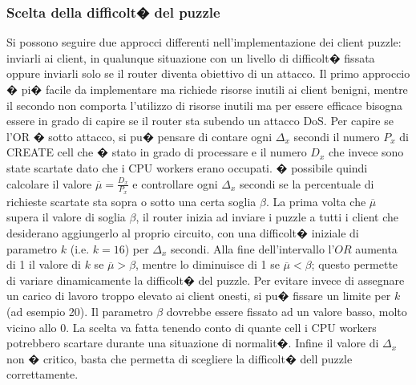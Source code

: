 \subsubsection{Scelta della difficolt� del puzzle}
Si possono seguire due approcci differenti nell'implementazione dei client puzzle: inviarli ai client, in qualunque situazione con un livello di difficolt� fissata oppure inviarli solo se il router diventa obiettivo di un attacco. Il primo approccio � pi� facile da implementare ma richiede risorse inutili ai client benigni, mentre il secondo non comporta l'utilizzo di risorse inutili ma per essere efficace bisogna essere in grado di capire se il router sta subendo un attacco DoS. Per capire se l'OR � sotto attacco, si pu� pensare di contare ogni $\Delta_{x}$ secondi il numero $P_{x}$ di {\ttfamily CREATE} cell che � stato in grado di processare e il numero $D_{x}$ che invece sono state scartate dato che i CPU workers erano occupati. � possibile quindi calcolare il valore $\overline{\mu}=\frac{D_{x}}{P_{x}}$ e controllare ogni $\Delta_{x}$ secondi se la percentuale di richieste scartate sta sopra o sotto una certa soglia $\beta$. La prima volta che $\overline{\mu}$ supera il valore di soglia $\beta$, il router inizia ad inviare i puzzle a tutti i client che desiderano aggiungerlo al proprio circuito, con una difficolt� iniziale di parametro $k$ (i.e. $k=16$) per $\Delta_{x}$ secondi. Alla fine dell'intervallo l'$OR$ aumenta di 1 il valore di $k$ se $\overline{\mu}>\beta$, mentre lo diminuisce di 1 se $\overline{\mu}<\beta$; questo permette di variare dinamicamente la difficolt� del puzzle. Per evitare invece di assegnare un carico di lavoro troppo elevato ai client onesti, si pu� fissare un limite per $k$ (ad esempio 20). Il parametro $\beta$ dovrebbe essere fissato ad un valore basso, molto vicino allo 0. La scelta va fatta tenendo conto di quante cell i CPU workers potrebbero scartare durante una situazione di normalit�. Infine il valore di $\Delta_{x}$ non � critico, basta che permetta di scegliere la difficolt� dell puzzle correttamente.

